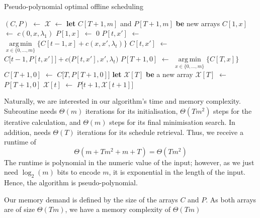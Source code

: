 \documentclass[hidelinks]{article}
\newcommand\Let[2]{\State #1 $\gets$ #2}
\newcommand\Blet[2]{\State \textbf{let} #1 \textbf{be} #2}
\theoremstyle{plain}
\theoremstyle{definition}
\theoremstyle{rem}
\DeclareMathOperator*{\argmin}{arg\,min}
\newcommand{\mx}{\mathcal{X}}
\newcommand{\costs}{c}
\newcommand{\fromto}[2]{\{#1,\ldots,#2\}}
\begin{document}
\begin{algorithm}[H]
  \caption{Pseudo-polynomial optimal offline scheduling}
  \begin{algorithmic}[1]
	  \Let{$(C,P)$}{}
	  \Let{$\mx$}{\Call{extract\_schedule}{$P,T$}}
	  \State \Return{$\mx$}
  \EndFunction
  \Statex
	\Blet{$C[T+1,m]$ and $P[T+1,m]$}{new arrays}
		\Let{$C[1,x]$}{$\costs(0,x,\lambda_1)$}
		\Let{$P[1,x]$}{$0$}
	\EndFor
			\Let{$P[t,x']$}{$\argmin\limits_{x\in\fromto{0}{m}}\bigl\{C[t-1,x]+\costs(x,x',\lambda_t)\bigr\}$}
			\Let{$C[t,x']$}{$C\bigl[t-1,P[t,x']\bigr]+c\bigl(P[t,x'],x',\lambda_t\bigr)$}
		\EndFor
	\EndFor
	\Let{$P[T+1,0]$}{$\argmin\limits_{x\in\fromto{0}{m}}\bigl\{C[T,x]\bigr\}$}
	\Let{$C[T+1,0]$}{$C\bigl[T,P[T+1,0]\bigr]$}
	\State {}
  \EndFunction
  \Statex
	\Blet{$\mx[T]$}{a new array}
    	\Let{$\mx[T]$}{$P[T+1,0]$}
		\Let{$\mx[t]$}{$P\bigl[t+1,\mx[t+1]\bigr]$}
	\EndFor
	\State \Return{$\mx$}
  \EndFunction

  \end{algorithmic}
\label{alg_opt_offline}
\end{algorithm}
Naturally, we are interested in our algorithm's time and memory complexity. Subroutine
 needs $\Theta(m)$ iterations for its initialisation, $\Theta(Tm^2)$ steps for the iterative calculation, and $\Theta(m)$ steps for its final minimisation search. In addition,  needs $\Theta(T)$ iterations for its schedule retrieval. Thus, we receive a runtime of 
\begin{equation*}
	\Theta(m+Tm^2+m+T)=\Theta(Tm^2)
\end{equation*}
The runtime is polynomial in the numeric value of the input; however, as we just need $\log_2(m)$ bits to encode $m$, it is exponential in the length of the input. Hence, the algorithm is pseudo-polynomial.

Our memory demand is defined by the size of the arrays $C$ and $P$. As both arrays are of size $\Theta(Tm)$, we have a memory complexity of $\Theta(Tm)$
\end{document}
